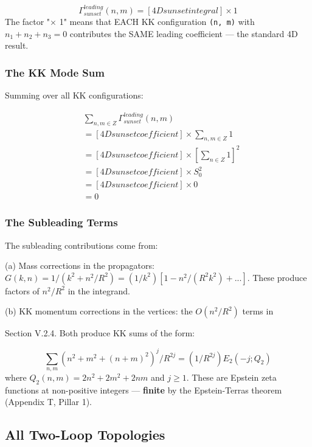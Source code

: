 \documentclass[aps,prd,preprint,superscriptaddress,longbibliography,floatfix]{revtex4-2}
\theoremstyle{remark}
\begin{document}
\begin{equation}
    \Gamma_{sunset}^{leading}(n, m) = [4D sunset integral] \times 1
\end{equation}
The factor "$\times$ 1" means that EACH KK configuration \texttt{(n, m)} with $n_{1} + n_{2} + n_{3} = 0$ contributes the SAME leading coefficient --- the standard 4D result.


\subsubsection{The KK Mode Sum}

Summing over all KK configurations:


\begin{align}
    & \sum_{n,m \in Z} \Gamma_{sunset}^{leading}(n, m) \\
    & = [4D sunset coefficient] \times \sum_{n,m \in Z} 1 \\
    & = [4D sunset coefficient] \times [\sum_{n \in Z} 1]^{2} \\
    & = [4D sunset coefficient] \times S_{0}^{2} \\
    & = [4D sunset coefficient] \times 0 \\
    & = 0
\end{align}

\subsubsection{The Subleading Terms}

The subleading contributions come from:

(a) Mass corrections in the propagators: $G(k,n) = 1/(k^{2} + n^{2}/R^{2}) = (1/k^{2})[1 - n^{2}/(R^{2}k^{2}) + ...]$. These produce factors of $n^{2}/R^{2}$ in the integrand.

(b) KK momentum corrections in the vertices: the $O(n^{2}/R^{2})$ terms in

Section V.2.4.
Both produce KK sums of the form:


\begin{equation}
    \sum_{n,m} (n^{2} + m^{2} + (n+m)^{2})^j / R^{2j} = (1/R^{2j}) E_{2}(-j; Q_{2})
\end{equation}
where $Q_{2}(n,m) = 2n^{2} + 2m^{2} + 2nm$ and $j \geq 1$. These are Epstein zeta functions at non-positive integers --- \textbf{finite} by the Epstein-Terras theorem (Appendix T, Pillar 1).



\subsection{All Two-Loop Topologies}
\end{document}
